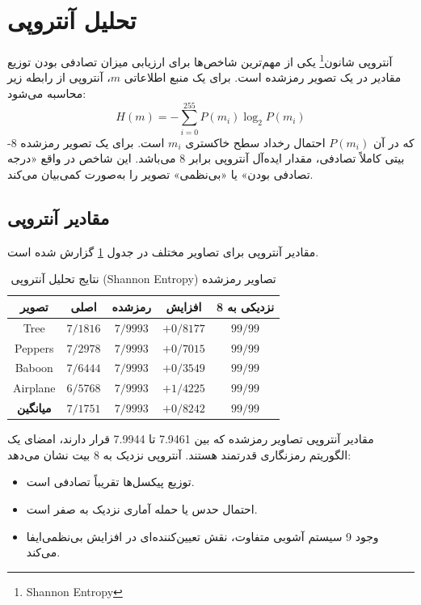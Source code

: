 \documentclass[a4paper,12pt]{report}
\renewcommand{\%}{\lr{\oldpercent}}
\providecommand{\lr}[1]{#1}
\providecommand{\LTRfootnote}[1]{\footnote{#1}}
\begin{document}
    \vspace{1em}
    

\section{تحلیل آنتروپی}
آنتروپی شانون\LTRfootnote{Shannon Entropy} یکی از مهم‌ترین شاخص‌ها برای ارزیابی میزان تصادفی بودن توزیع مقادیر در یک تصویر رمزشده است. برای یک منبع اطلاعاتی $m$، آنتروپی از رابطه زیر محاسبه می‌شود:
\begin{equation} \label{eq:entropy_ch4}
H(m) = -\sum_{i=0}^{255} P(m_i) \log_2 P(m_i)
\end{equation}
که در آن $P(m_i)$ احتمال رخداد سطح خاکستری $m_i$ است. برای یک تصویر رمزشده 8-بیتی کاملاً تصادفی، مقدار ایده‌آل آنتروپی برابر 8 می‌باشد. این شاخص در واقع «درجه تصادفی بودن» یا «بی‌نظمی» تصویر را به‌صورت کمی‌بیان می‌کند.

\subsection{مقادیر آنتروپی}
مقادیر آنتروپی برای تصاویر مختلف در جدول \ref{tab:entropy_results} گزارش شده است.

\begin{table}[h]
\centering
\caption{نتایج تحلیل آنتروپی (\lr{Shannon Entropy}) تصاویر رمزشده} \label{tab:entropy_results}
\begin{tabular}{|c|c|c|c|c|}
\hline
\textbf{تصویر} & \textbf{اصلی} & \textbf{رمزشده} & \textbf{افزایش} & \textbf{نزدیکی به 8} \\ \hline
\lr{Tree} & $7/1816$ & $7/9993$ & $+0/8177$ & $99/99$\% \\ \hline
\lr{Peppers} & $7/2978$ & $7/9993$ & $+0/7015$ & $99/99$\% \\ \hline
\lr{Baboon} & $7/6444$ & $7/9993$ & $+0/3549$ & $99/99$\% \\ \hline
\lr{Airplane} & $6/5768$ & $7/9993$ & $+1/4225$ & $99/99$\% \\ \hline
\textbf{میانگین} & $7/1751$ & $7/9993$ & $+0/8242$ & $99/99$\% \\ \hline
\end{tabular}
\end{table}

مقادیر آنتروپی تصاویر رمزشده که بین 7.9461 تا 7.9944 قرار دارند، امضای یک الگوریتم رمزنگاری قدرتمند هستند. آنتروپی نزدیک به 8 بیت نشان می‌دهد:
\begin{itemize}
    \item توزیع پیکسل‌ها تقریباً تصادفی است.
    \item احتمال حدس یا حمله آماری نزدیک به صفر است.
    \item وجود 9 سیستم آشوبی متفاوت، نقش تعیین‌کننده‌ای در افزایش بی‌نظمی‌ایفا می‌کند.
\end{itemize}
\end{document}
